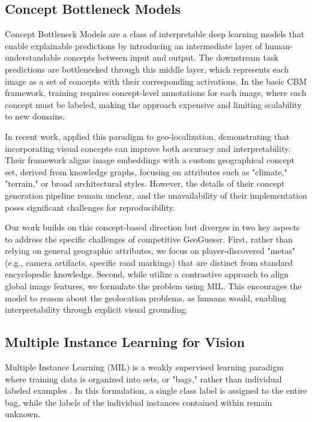 \documentclass{article}
\begin{document}
\subsection{Concept Bottleneck Models}

Concept Bottleneck Models \cite{koh2020conceptbottleneckmodels} are a class of interpretable deep learning models that enable explainable predictions by introducing an intermediate layer of human-understandable concepts between input and output. The downstream task predictions are bottlenecked through this middle layer, which represents each image as a set of concepts with their corresponding activations. In the basic CBM framework, training requires concept-level annotations for each image, where each concept must be labeled, making the approach expensive and limiting scalability to new domains.

In recent work, \cite{jia2025interpretablegeolocalizationconceptawareglobal} applied this paradigm to geo-localization, demonstrating that incorporating visual concepts can improve both accuracy and interpretability. Their framework aligns image embeddings with a custom geographical concept set,  derived from knowledge graphs, focusing on attributes such as "climate," "terrain," or broad architectural styles. However, the details of their concept generation pipeline remain unclear, and the unavailability of their implementation poses significant challenges for reproducibility.

Our work builds on this concept-based direction but diverges in two key aspects to address the specific challenges of competitive GeoGuessr. First, rather than relying on general geographic attributes, we focus on player-discovered "metas" (e.g., camera artifacts, specific road markings) that are distinct from standard encyclopedic knowledge. Second, while \cite{jia2025interpretablegeolocalizationconceptawareglobal} utilize a contrastive approach to align global image features, we formulate the problem using MIL. This encourages the model to reason about the geolocation problems, as humans would, enabling interpretability through explicit visual grounding.


\subsection{Multiple Instance Learning for Vision}

Multiple Instance Learning (MIL) is a weakly supervised learning paradigm where training data is organized into sets, or "bags," rather than individual labeled examples \cite{Dietterich1997SolvingTM}. In this formulation, a single class label is assigned to the entire bag, while the labels of the individual instances contained within remain unknown.
\end{document}
